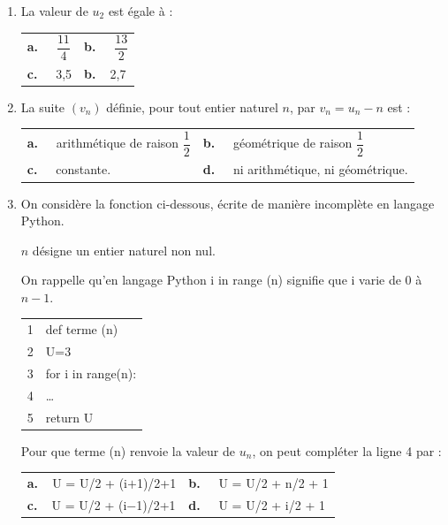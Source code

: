 \documentclass[10pt]{article}
\providecommand{\dotfill}{\ldots}
\begin{document}
\begin{enumerate}
\item La valeur de $u_2$ est égale à :

\begin{center}
\begin{tabularx}{\linewidth}{*{2}{X}}
\textbf{a.~~} $\dfrac{11}{4}$& \textbf{b.~~} $\dfrac{13}{2}$\\
\textbf{c.~~} 3,5&\textbf{b.~~}2,7
\end{tabularx}
\end{center}

\item La suite $\left(v_n\right)$ définie, pour tout entier naturel $n$, par $v_n = u_n - n$ est :

\begin{center}
\begin{tabularx}{\linewidth}{*{2}{X}}
\textbf{a.~~} arithmétique de raison $\dfrac12$&\textbf{b.~~} géométrique de raison $\dfrac12$\\
\textbf{c.~~}  constante. &\textbf{d.~~}  ni arithmétique, ni géométrique.
\end{tabularx}
\end{center}

\item On considère la fonction ci-dessous, écrite de manière incomplète en langage Python.

\begin{minipage}{0.58\linewidth}
$n$ désigne un entier naturel non nul. 

On rappelle qu'en langage Python
\og i in range (n)\fg{} signifie que i varie de 0 à $n-1$.
\end{minipage}\hfill
\begin{minipage}{0.38\linewidth}
\begin{tabular}{|c|l|}\hline
1&def terme (n)\\
2&\qquad U=3\\
3&\qquad for i in range(n): \\
4& \dotfill \\
5&\qquad return U\\ \hline
\end{tabular}
\end{minipage}

Pour que terme (n) renvoie la valeur de $u_n$, on peut compléter la ligne 4 par : 

\begin{center}
\begin{tabularx}{\linewidth}{*{2}{X}}
\textbf{a.~~}U = U/2 + (i$+$1)/2+1	&\textbf{b.~~} U = U/2 + n/2 + 1\\
\textbf{c.~~}U = U/2 + (i$-$1)/2+1 	&\textbf{d.~~} U = U/2 + i/2 + 1
\end{tabularx}
\end{center}
\end{enumerate}
\end{document}
